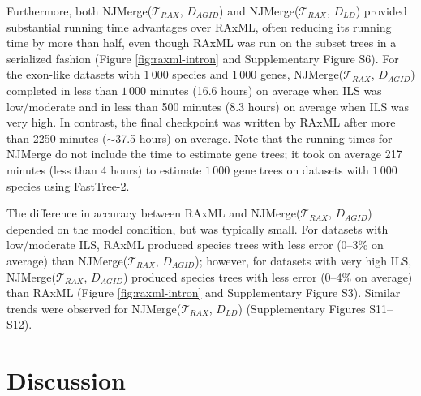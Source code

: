 Furthermore, both NJMerge($\mathcal{T}_{RAX}$, $D_{AGID}$) and NJMerge($\mathcal{T}_{RAX}$, $D_{LD}$) provided substantial running time advantages over RAxML, often reducing its running time by more than half, even though RAxML was run on the subset trees in a serialized fashion (Figure \ref{fig:raxml-intron} and Supplementary Figure S6).
For the exon-like datasets with $1\,000$ species and $1\,000$ genes,  NJMerge($\mathcal{T}_{RAX}$, $D_{AGID}$) completed in less than $1\,000$ minutes (16.6 hours) on average when ILS was low/moderate and in less than 500 minutes (8.3 hours) on average when ILS was very high.
In contrast, the final checkpoint was written by RAxML after more than 2250 minutes ($\sim$37.5 hours) on average.
Note that the running times for NJMerge do not include the time to estimate gene trees; it took on average 217 minutes (less than 4 hours) to estimate $1\,000$ gene trees on datasets with $1\,000$ species using FastTree-2.

The difference in accuracy between RAxML and NJMerge($\mathcal{T}_{RAX}$, $D_{AGID}$) depended on the model condition, but was typically small.
For datasets with low/moderate ILS, RAxML produced species trees with less error (0--3\% on average) than NJMerge($\mathcal{T}_{RAX}$, $D_{AGID}$); however, for datasets with very high ILS, NJMerge($\mathcal{T}_{RAX}$, $D_{AGID}$) produced species trees with less error (0--4\% on average) than RAxML (Figure \ref{fig:raxml-intron} and Supplementary Figure S3).
Similar trends were observed for NJMerge($\mathcal{T}_{RAX}$, $D_{LD}$) (Supplementary Figures S11--S12).

\section{Discussion}
\label{sec:njmerge-discussion}
